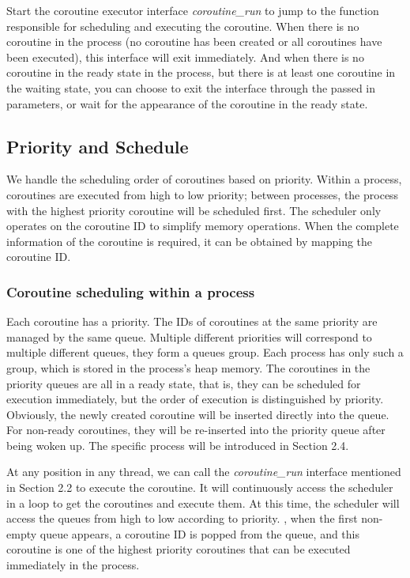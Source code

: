 \documentclass[10pt]{article}
\begin{document}
Start the coroutine executor interface \textit{coroutine\_run} to jump to the function responsible for scheduling and executing the coroutine. When there is no coroutine in the process (no coroutine has been created or all coroutines have been executed), this interface will exit immediately. And when there is no coroutine in the ready state in the process, but there is at least one coroutine in the waiting state, you can choose to exit the interface through the passed in parameters, or wait for the appearance of the coroutine in the ready state.


\subsection{Priority and Schedule}

We handle the scheduling order of coroutines based on priority. Within a process, coroutines are executed from high to low priority; between processes, the process with the highest priority coroutine will be scheduled first. The scheduler only operates on the coroutine ID to simplify memory operations. When the complete information of the coroutine is required, it can be obtained by mapping the coroutine ID.


\subsubsection{Coroutine scheduling within a process}

Each coroutine has a priority. The IDs of coroutines at the same priority are managed by the same queue. Multiple different priorities will correspond to multiple different queues, they form a queues group. Each process has only such a group, which is stored in the process's heap memory. The coroutines in the priority queues are all in a ready state, that is, they can be scheduled for execution immediately, but the order of execution is distinguished by priority. Obviously, the newly created coroutine will be inserted directly into the queue. For non-ready coroutines, they will be re-inserted into the priority queue after being woken up. The specific process will be introduced in Section 2.4.

At any position in any thread, we can call the \textit{coroutine\_run} interface mentioned in Section 2.2 to execute the coroutine. It will continuously access the scheduler in a loop to get the coroutines and execute them. At this time, the scheduler will access the queues from high to low according to priority. , when the first non-empty queue appears, a coroutine ID is popped from the queue, and this coroutine is one of the highest priority coroutines that can be executed immediately in the process.
\end{document}
